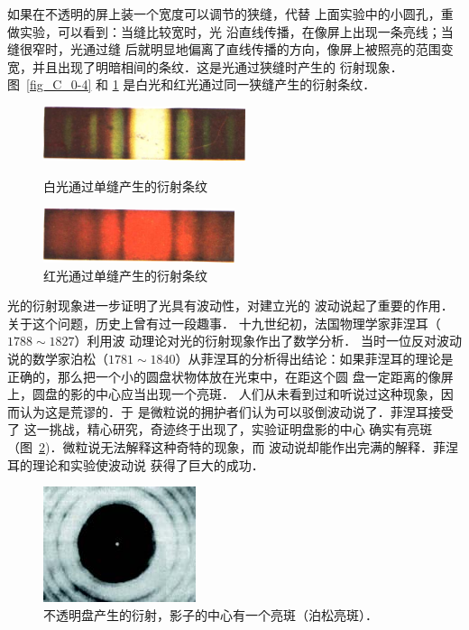 如果在不透明的屏上装一个宽度可以调节的狭缝，代替
上面实验中的小圆孔，重做实验，可以看到：当缝比较宽时，光
沿直线传播，在像屏上出现一条亮线；当缝很窄时，光通过缝
后就明显地偏离了直线传播的方向，像屏上被照亮的范围变
宽，并且出现了明暗相间的条纹．这是光通过狭缝时产生的
衍射现象．
图~\ref{fig_C_0-4} 和 \ref{fig_C_0-5} 是白光和红光通过同一狭缝产生的衍射条纹．
\begin{figure}[htbp]
	\centering
	\begin{minipage}[b]{0.48\linewidth}
		\centering
		\includegraphics[height=1.6cm]{fig/C/0-4.png}
		\caption{白光通过单缝产生的衍射条纹}\label{fig_C_0-4}
	\end{minipage}
	\hfil
	\begin{minipage}[b]{0.48\linewidth}
		\centering
		\includegraphics[height=1.6cm]{fig/C/0-5.png}
		\caption{红光通过单缝产生的衍射条纹}\label{fig_C_0-5}
	\end{minipage}
\end{figure}


光的衍射现象进一步证明了光具有波动性，对建立光的
波动说起了重要的作用．关于这个问题，历史上曾有过一段趣事．
十九世纪初，法国物理学家菲涅耳（$1788 \sim 1827$）利用波
动理论对光的衍射现象作出了数学分析．
当时一位反对波动
说的数学家泊松（$1781 \sim 1840$）从菲涅耳的分析得出结论：如果菲涅耳的理论是
正确的，那么把一个小的圆盘状物体放在光束中，在距这个圆
盘一定距离的像屏上，圆盘的影的中心应当出现一个亮斑．
人们从未看到过和听说过这种现象，因而认为这是荒谬的．于
是微粒说的拥护者们认为可以驳倒波动说了．菲涅耳接受了
这一挑战，精心研究，奇迹终于出现了，实验证明盘影的中心
确实有亮斑（图~\ref{fig_C_6-8})．微粒说无法解释这种奇特的现象，而
波动说却能作出完满的解释．菲涅耳的理论和实验使波动说
获得了巨大的成功．

\begin{figure}[htbp]
    \centering
    \includegraphics{fig/C/6-8.jpg}
    \caption{不透明盘产生的衍射，影子的中心有一个亮斑（泊松亮斑）．}\label{fig_C_6-8}
\end{figure}

